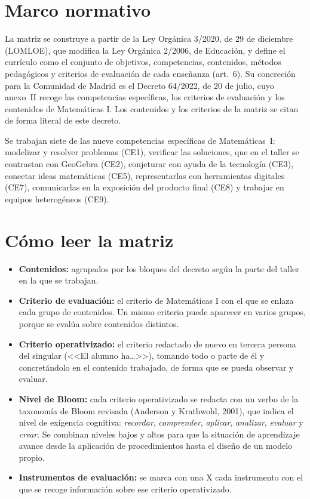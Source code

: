 \documentclass[11pt,a4paper]{article}
\begin{document}
\section{Marco normativo}
La matriz se construye a partir de la Ley Orgánica 3/2020, de 29 de diciembre
(LOMLOE), que modifica la Ley Orgánica 2/2006, de Educación, y define el
currículo como el conjunto de objetivos, competencias, contenidos, métodos
pedagógicos y criterios de evaluación de cada enseñanza (art.~6). Su
concreción para la Comunidad de Madrid es el Decreto 64/2022, de 20 de julio,
cuyo anexo~II recoge las competencias específicas, los criterios de
evaluación y los contenidos de Matemáticas I. Los contenidos y los criterios
de la matriz se citan de forma literal de este decreto.

Se trabajan siete de las nueve competencias específicas de Matemáticas~I:
modelizar y resolver problemas (CE1), verificar las soluciones, que en el
taller se contrastan con GeoGebra (CE2), conjeturar con ayuda de la
tecnología (CE3), conectar ideas matemáticas (CE5), representarlas con
herramientas digitales (CE7), comunicarlas en la exposición del producto
final (CE8) y trabajar en equipos heterogéneos (CE9).

\section{Cómo leer la matriz}
\begin{itemize}
  \item \textbf{Contenidos:} agrupados por los bloques del decreto según la
    parte del taller en la que se trabajan.
  \item \textbf{Criterio de evaluación:} el criterio de Matemáticas I con el
    que se enlaza cada grupo de contenidos. Un mismo criterio puede aparecer
    en varios grupos, porque se evalúa sobre contenidos distintos.
  \item \textbf{Criterio operativizado:} el criterio redactado de nuevo en tercera persona del singular (<<El alumno ha\ldots>>),
    tomando todo o parte de él y concretándolo en el contenido trabajado, de
    forma que se pueda observar y evaluar.
  \item \textbf{Nivel de Bloom:} cada criterio operativizado se redacta con
    un verbo de la taxonomía de Bloom revisada (Anderson y Krathwohl, 2001),
    que indica el nivel de exigencia cognitiva: \emph{recordar},
    \emph{comprender}, \emph{aplicar}, \emph{analizar}, \emph{evaluar} y
    \emph{crear}. Se combinan niveles bajos y altos para que la situación de
    aprendizaje avance desde la aplicación de procedimientos hasta el diseño
    de un modelo propio.
  \item \textbf{Instrumentos de evaluación:} se marca con una X cada
    instrumento con el que se recoge información sobre ese criterio
    operativizado.
\end{itemize}
\end{document}

